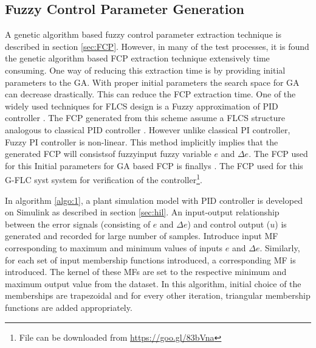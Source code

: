 \subsection{Fuzzy Control Parameter Generation} \label{sec:fcpgen}
A genetic algorithm based fuzzy control parameter extraction technique is described in section \ref{sec:FCP}. However, in many of the test processes, it is found the genetic algorithm based FCP extraction technique extensively time consuming. One way of reducing this extraction time is by providing initial parameters to the GA. With proper initial parameters the search space for GA can decrease drastically. This can reduce the FCP extraction time. One of the widely used techniques for FLCS design is a Fuzzy approximation of PID controller \cite{Lin2009,Wang1992a}. The FCP generated from this scheme assume a FLCS structure analogous to classical PID controller \cite{Murray2009,bookBehera2009,Arun2014,bookBogdan2006a}. However unlike classical PI controller, Fuzzy PI controller is non\hyp{}linear. This method implicitly implies that the generated FCP will consistsof fuzzyinput fuzzy variable $ e $ and $\Delta e$. The FCP used for this Initial parameters for GA based FCP is finallys \cite{Sahu2015,Demir2011b}. The FCP used for this G\hyp{}FLC syst system for verification of the controller\footnote{File can be downloaded from \url{https://goo.gl/83bVna}}. 

In algorithm \ref{algo:1}, a plant simulation model with PID controller is developed on Simulink as described in section \ref{sec:hil}. An input-output relationship between the error signals (consisting of $ e $ and $\Delta e$) and control output ($ u $) is generated and recorded for large number of samples. Introduce input MF corresponding to maximum and minimum values of inputs $ e $ and $\Delta e$. Similarly, for each set of input membership functions introduced, a corresponding MF is introduced. The kernel of these MFs are set to the respective minimum and maximum output value from the dataset. In this algorithm, initial choice of the memberships are trapezoidal and for every other iteration, triangular membership functions are added appropriately.     

